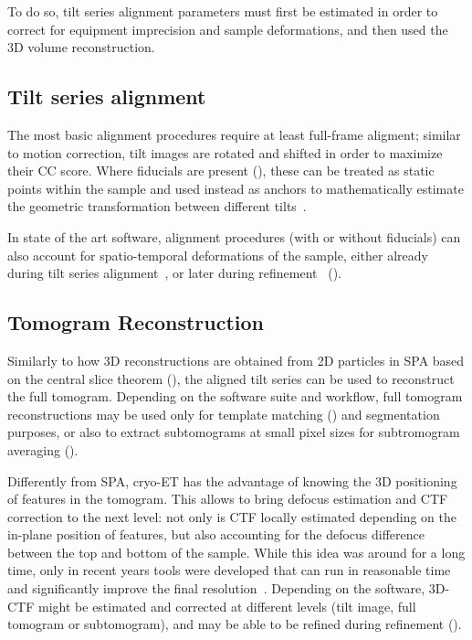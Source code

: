 To do so, tilt series alignment parameters must first be estimated in order to correct for equipment imprecision and sample deformations, and then used the 3D volume reconstruction.

\subsection{Tilt series alignment}\label{et_tilt_series_alignment}
The most basic alignment procedures require at least full-frame aligment; similar to motion correction, tilt images are rotated and shifted in order to maximize their CC score.
Where fiducials are present (), these can be treated as static points within the sample and used instead as anchors to mathematically estimate the geometric transformation between different tilts~\cite{nicastroMolecularArchitectureAxonemes2006,heumannClusteringVarianceMaps2011,castano-diezDynamoCatalogueGeometrical2017}.

In state of the art software, alignment procedures (with or without fiducials) can also account for spatio-temporal deformations of the sample, either already during tilt series alignment~\cite{zhengAreTomoIntegratedSoftware2022}, or later during refinement~\cite{tegunovMultiparticleCryoEMRefinement2021,burtImageProcessingPipeline2024,galaz-montoyaSingleParticleTomography2015,chenCompleteDataProcessing2019} ().

\subsection{Tomogram Reconstruction}\label{et_tomo_reconstruction}
Similarly to how 3D reconstructions are obtained from 2D particles in SPA based on the central slice theorem (), the aligned tilt series can be used to reconstruct the full tomogram.
Depending on the software suite and workflow, full tomogram reconstructions may be used only for template matching () and segmentation purposes, or also to extract subtomograms at small pixel sizes for subtromogram averaging ().

Differently from SPA, cryo-ET has the advantage of knowing the 3D positioning of features in the tomogram.
This allows to bring defocus estimation and CTF correction to the next level: not only is CTF locally estimated depending on the in-plane position of features, but also accounting for the defocus difference between the top and bottom of the sample.
While this idea was around for a long time, only in recent years tools were developed that can run in reasonable time and significantly improve the final resolution~\cite{turonovaEfficient3DCTFCorrection2017,tegunovRealtimeCryoelectronMicroscopy2019}. 
Depending on the software, 3D-CTF might be estimated and corrected at different levels (tilt image, full tomogram or subtomogram), and may be able to be refined during refinement ().

